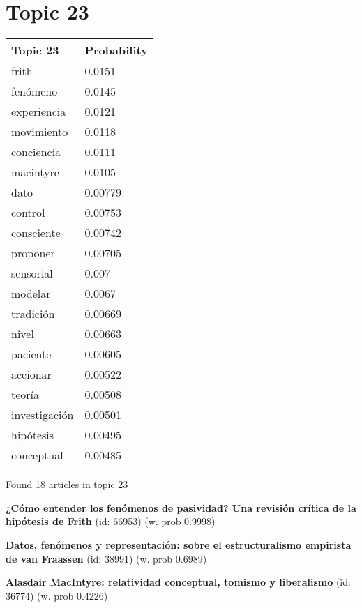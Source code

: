 \documentclass{article}
\begin{document}
\vfill
\newpage


\centering
\thispagestyle{empty}
\section*{Topic 23}\vfill
\begin{tabular}{ll}
\toprule
      Topic 23 & Probability \\
\midrule
         frith &      0.0151 \\
      fenómeno &      0.0145 \\
   experiencia &      0.0121 \\
    movimiento &      0.0118 \\
    conciencia &      0.0111 \\
     macintyre &      0.0105 \\
          dato &     0.00779 \\
       control &     0.00753 \\
    consciente &     0.00742 \\
      proponer &     0.00705 \\
     sensorial &       0.007 \\
       modelar &      0.0067 \\
     tradición &     0.00669 \\
         nivel &     0.00663 \\
      paciente &     0.00605 \\
      accionar &     0.00522 \\
        teoría &     0.00508 \\
 investigación &     0.00501 \\
     hipótesis &     0.00495 \\
    conceptual &     0.00485 \\
\bottomrule
\end{tabular}

\vfill
Found 18 articles in topic 23
\vfill

\textbf{¿Cómo entender los fenómenos de pasividad?  Una revisión crítica de la hipótesis de Frith} (id: 66953)
 (w. prob 0.9998)
\vfill

\textbf{Datos, fenómenos y representación:  sobre el estructuralismo empirista de van Fraassen} (id: 38991)
 (w. prob 0.6989)
\vfill

\textbf{Alasdair MacIntyre: relatividad conceptual, tomismo y liberalismo} (id: 36774)
 (w. prob 0.4226)

\vfill
\newpage
\end{document}
